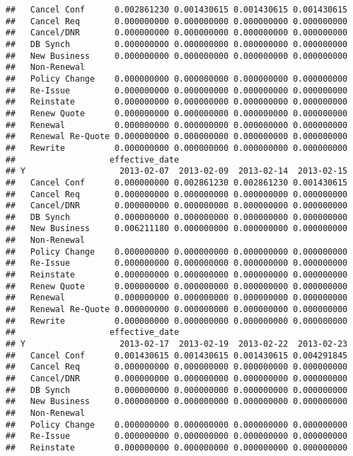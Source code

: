 \documentclass[]{article}
\begin{document}
\begin{verbatim}
##   Cancel Conf      0.002861230 0.001430615 0.001430615 0.001430615
##   Cancel Req       0.000000000 0.000000000 0.000000000 0.000000000
##   Cancel/DNR       0.000000000 0.000000000 0.000000000 0.000000000
##   DB Synch         0.000000000 0.000000000 0.000000000 0.000000000
##   New Business     0.000000000 0.000000000 0.000000000 0.000000000
##   Non-Renewal                                                     
##   Policy Change    0.000000000 0.000000000 0.000000000 0.000000000
##   Re-Issue         0.000000000 0.000000000 0.000000000 0.000000000
##   Reinstate        0.000000000 0.000000000 0.000000000 0.000000000
##   Renew Quote      0.000000000 0.000000000 0.000000000 0.000000000
##   Renewal          0.000000000 0.000000000 0.000000000 0.000000000
##   Renewal Re-Quote 0.000000000 0.000000000 0.000000000 0.000000000
##   Rewrite          0.000000000 0.000000000 0.000000000 0.000000000
##                   effective_date
## Y                   2013-02-07  2013-02-09  2013-02-14  2013-02-15
##   Cancel Conf      0.000000000 0.002861230 0.002861230 0.001430615
##   Cancel Req       0.000000000 0.000000000 0.000000000 0.000000000
##   Cancel/DNR       0.000000000 0.000000000 0.000000000 0.000000000
##   DB Synch         0.000000000 0.000000000 0.000000000 0.000000000
##   New Business     0.006211180 0.000000000 0.000000000 0.000000000
##   Non-Renewal                                                     
##   Policy Change    0.000000000 0.000000000 0.000000000 0.000000000
##   Re-Issue         0.000000000 0.000000000 0.000000000 0.000000000
##   Reinstate        0.000000000 0.000000000 0.000000000 0.000000000
##   Renew Quote      0.000000000 0.000000000 0.000000000 0.000000000
##   Renewal          0.000000000 0.000000000 0.000000000 0.000000000
##   Renewal Re-Quote 0.000000000 0.000000000 0.000000000 0.000000000
##   Rewrite          0.000000000 0.000000000 0.000000000 0.000000000
##                   effective_date
## Y                   2013-02-17  2013-02-19  2013-02-22  2013-02-23
##   Cancel Conf      0.001430615 0.001430615 0.001430615 0.004291845
##   Cancel Req       0.000000000 0.000000000 0.000000000 0.000000000
##   Cancel/DNR       0.000000000 0.000000000 0.000000000 0.000000000
##   DB Synch         0.000000000 0.000000000 0.000000000 0.000000000
##   New Business     0.000000000 0.000000000 0.000000000 0.000000000
##   Non-Renewal                                                     
##   Policy Change    0.000000000 0.000000000 0.000000000 0.000000000
##   Re-Issue         0.000000000 0.000000000 0.000000000 0.000000000
##   Reinstate        0.000000000 0.000000000 0.000000000 0.000000000

\end{verbatim}
\end{document}
